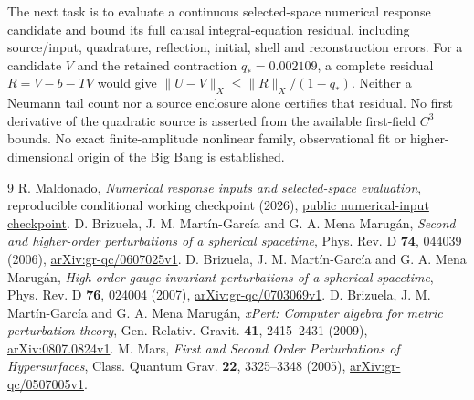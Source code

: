 \documentclass[11pt]{article}
\begin{document}
The next task is to evaluate a continuous selected-space numerical response
candidate and bound its full causal integral-equation residual, including
source/input, quadrature, reflection, initial, shell and reconstruction errors.
For a candidate $V$ and the retained contraction $q_*=0.002109$, a complete
residual $R=V-b-TV$ would give
$\|U-V\|_X\le\|R\|_X/(1-q_*)$.
Neither a Neumann tail count nor a source enclosure alone certifies that
residual. No first derivative of the quadratic source is asserted from the
available first-field $C^3$ bounds. No exact finite-amplitude nonlinear family,
observational fit or higher-dimensional origin of the Big Bang is established.

\begin{thebibliography}{9}
 R. Maldonado, \emph{Numerical response inputs and selected-space
evaluation}, reproducible conditional working checkpoint (2026),
\href{https://github.com/maldonado-research/HDblast/tree/main/research/HDBLAST_NUMERICAL_RESPONSE_INPUTS_20261016}{public numerical-input checkpoint}.
 D. Brizuela, J. M. Mart\'in-Garc\'ia and G. A. Mena Marug\'an,
\emph{Second and higher-order perturbations of a spherical spacetime},
Phys. Rev. D \textbf{74}, 044039 (2006),
\href{https://arxiv.org/abs/gr-qc/0607025v1}{arXiv:gr-qc/0607025v1}.
 D. Brizuela, J. M. Mart\'in-Garc\'ia and G. A. Mena Marug\'an,
\emph{High-order gauge-invariant perturbations of a spherical spacetime},
Phys. Rev. D \textbf{76}, 024004 (2007),
\href{https://arxiv.org/abs/gr-qc/0703069v1}{arXiv:gr-qc/0703069v1}.
 D. Brizuela, J. M. Mart\'in-Garc\'ia and G. A. Mena Marug\'an,
\emph{xPert: Computer algebra for metric perturbation theory},
Gen. Relativ. Gravit. \textbf{41}, 2415--2431 (2009),
\href{https://arxiv.org/abs/0807.0824v1}{arXiv:0807.0824v1}.
 M. Mars, \emph{First and Second Order Perturbations of
Hypersurfaces}, Class. Quantum Grav. \textbf{22}, 3325--3348 (2005),
\href{https://arxiv.org/abs/gr-qc/0507005v1}{arXiv:gr-qc/0507005v1}.
\end{thebibliography}
\end{document}
